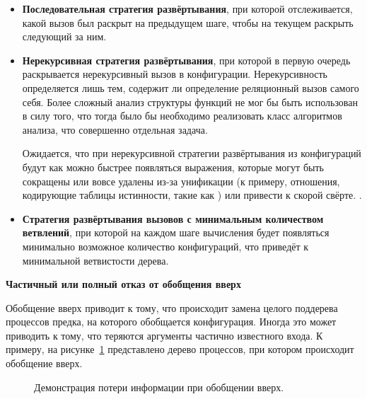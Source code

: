 \begin{itemize}
\item {\bf Последовательная стратегия развёртывания}, при которой отслеживается,
      какой вызов был раскрыт на предыдущем шаге, чтобы на текущем
      раскрыть следующий за ним.
\item {\bf Нерекурсивная стратегия развёртывания}, при которой в первую очередь
      раскрывается нерекурсивный вызов в конфигурации. Нерекурсивность определяется
      лишь тем, содержит ли определение реляционный вызов самого себя. Более сложный
      анализ структуры функций не мог бы быть использован в силу того, что тогда
      было бы необходимо реализовать класс алгоритмов анализа, что совершенно отдельная задача.

      Ожидается, что при нерекурсивной стратегии развёртывания из конфигураций
      будут как можно быстрее появляться выражения, которые могут быть сокращены
      или вовсе удалены из-за унификации (к примеру, отношения, кодирующие
      таблицы истинности, такие как ) или привести к скорой свёрте.
      .

\item {\bf Стратегия развёртывания вызовов с минимальным количеством ветвлений},
      при которой на каждом шаге вычисления будет появляться минимально возможное количество
      конфигураций, что приведёт к минимальной ветвистости дерева.
\end{itemize}


\textbf{Частичный или полный отказ от обобщения вверх}

Обобщение вверх приводит к тому, что происходит замена целого поддерева процессов
предка, на которого обобщается конфигурация. Иногда это может приводить к тому, что
теряются аргументы частично известного входа. К примеру, на рисунке~\ref{fig:genup}
представлено дерево процессов, при котором происходит обобщение вверх.
\begin{figure}[h!]
\center
{}
\caption{Демонстрация потери информации при обобщении вверх.}
\label{fig:genup}
\end{figure}


